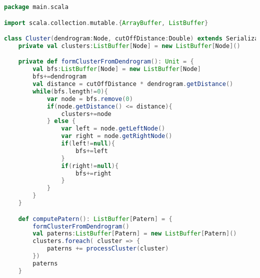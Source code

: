 \begin{lstlisting}[language=Scala, caption=Cluster.scala]
package main.scala

import scala.collection.mutable.{ArrayBuffer, ListBuffer}

class Cluster(dendrogram:Node, cutOffDistance:Double) extends Serializable {
    private val clusters:ListBuffer[Node] = new ListBuffer[Node]()

    private def formClusterFromDendrogram(): Unit = {
        val bfs:ListBuffer[Node] = new ListBuffer[Node]
        bfs+=dendrogram
        val distance = cutOffDistance * dendrogram.getDistance()
        while(bfs.length!=0){
            var node = bfs.remove(0)
            if(node.getDistance() <= distance){
                clusters+=node
            } else {
                var left = node.getLeftNode()
                var right = node.getRightNode()
                if(left!=null){
                    bfs+=left
                }
                if(right!=null){
                    bfs+=right
                }
            }
        }
    }

    def computePatern(): ListBuffer[Patern] = {
        formClusterFromDendrogram()
        val paterns:ListBuffer[Patern] = new ListBuffer[Patern]()
        clusters.foreach( cluster => {
            paterns += processCluster(cluster)
        })
        paterns
    }


\end{lstlisting}
